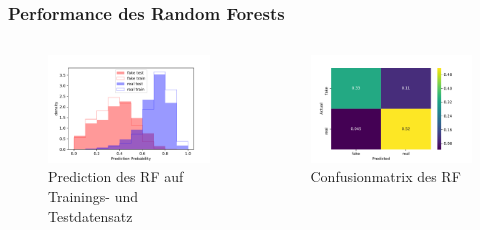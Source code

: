\documentclass[aspectratio=1610, professionalfonts, 9pt]{beamer}
\begin{document}
  \begin{frame}
    \frametitle{Performance des Random Forests}
    \begin{columns}
      \begin{figure}
          \includegraphics[width=\textwidth]{pictures/bow/RF/prob_bow_best_nn.pdf}
          \caption{Prediction des RF auf Trainings- und Testdatensatz}
          \label{}
      \end{figure}

      \begin{figure}
          \includegraphics[width=\textwidth]{pictures/bow/RF/cnfsn_mtx_bow_best_nn.pdf}
          \caption{Confusionmatrix des RF}
          \label{}
      \end{figure}
    \end{columns}
  \end{frame}
\end{document}
